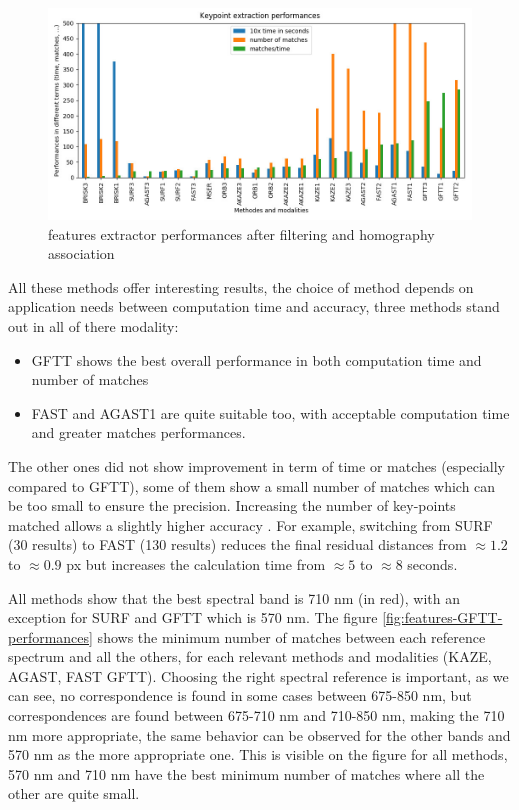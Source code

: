 \documentclass[../thesis.tex]{subfiles}
\begin{document}
	\begin{figure}[H]
		\centering
		\includegraphics[width=\linewidth]{img/registration/comparaison-keypoint-performances}
		\caption{features extractor performances after filtering and homography association}
		\label{fig:features-performances}
	\end{figure}
	
	All these methods offer interesting results, the choice of method depends on application needs between computation time and accuracy,
	three methods stand out in all of there modality:
	
	\begin{itemize}
		\item GFTT shows the best overall performance in both computation time and number of matches
		\item FAST and AGAST1 are quite suitable too, with acceptable computation time and greater matches performances.
	\end{itemize}
	
	\noindent
	The other ones did not show improvement in term of time or matches (especially compared to GFTT),
	some of them show a small number of matches which can be too small to ensure the precision.
	Increasing the number of key-points matched allows a slightly higher accuracy \cite{DantasDiasJunior}.
	For example, switching from SURF (30 results) to FAST (130 results) reduces the final residual distances
	from $\approx 1.2$ to $\approx 0.9$ px but increases the calculation time from $\approx 5$ to $\approx 8$ seconds.
	
	\par All methods show that the best spectral band is 710 nm (in red), with an exception for SURF and GFTT which is 570 nm.
	The figure \ref{fig:features-GFTT-performances} shows the minimum number of matches between each reference spectrum and all the others, for each relevant methods and modalities (KAZE, AGAST, FAST GFTT).
	Choosing the right spectral reference is important, as we can see, no correspondence is found in some cases between 675-850 nm,
	but correspondences are found between 675-710 nm and 710-850 nm,
	making the 710 nm more appropriate,
	the same behavior can be observed for the other bands and 570 nm as the more appropriate one.
	This is visible on the figure for all methods, 570 nm and 710 nm have the best minimum number of matches where all the other are quite small.
	
\end{document}
